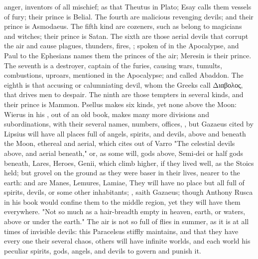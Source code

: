 anger, inventors of all mischief; as that Theutus in Plato; Esay calls them
vessels of fury; their prince is Belial. The fourth are
malicious revenging devils; and their prince is Asmodaeus. The fifth kind are
cozeners, such as belong to magicians and witches; their prince is Satan. The
sixth are those aerial devils that corrupt the air and
cause plagues, thunders, fires, \etc{}; spoken of in the Apocalypse, and Paul
to the Ephesians names them the princes of the air; Meresin is their prince.
The seventh is a destroyer, captain of the furies, causing wars, tumults,
combustions, uproars, mentioned in the Apocalypse; and called Abaddon. The
eighth is that accusing or calumniating devil, whom the Greeks call
\textgreek{Διαβολος}, that drives men to despair. The ninth are those tempters
in several kinds, and their prince is Mammon. Psellus makes six kinds, yet none
above the Moon: Wierus in his ,
out of an old book, makes many more divisions and subordinations, with their
several names, numbers, offices, \etc{}, but Gazaeus cited by
Lipsius will have all places full of angels, spirits, and
devils, above and beneath the Moon, ethereal and aerial,
which \Austin{} cites out of Varro 
"The celestial devils above, and aerial beneath," or, as some will, gods above,
Semi-dei or half gods beneath, Lares, Heroes, Genii, which climb higher, if
they lived well, as the Stoics held; but grovel on the ground as they were
baser in their lives, nearer to the earth: and are Manes, Lemures, Lamiae,
\etc{} They will have no place but all full of spirits,
devils, or some other inhabitants; , saith Gazaeus; though Anthony Rusca in his
book  would confine them to
the middle region, yet they will have them everywhere. "Not so much as a
hair-breadth empty in heaven, earth, or waters, above or under the earth." The
air is not so full of flies in summer, as it is at all times of invisible
devils: this Paracelsus stiffly maintains, and that they
have every one their several chaos, others will have infinite worlds, and each
world his peculiar spirits, gods, angels, and devils to govern and punish it.



